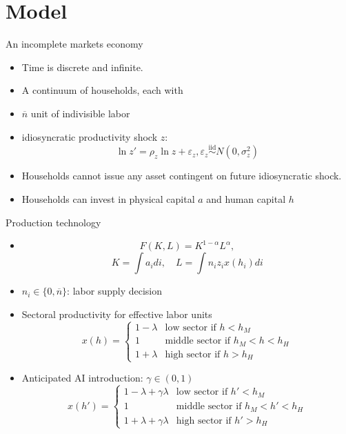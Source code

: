 \documentclass[serif, aspectratio=169]{beamer}
\theoremstyle{remark}
\theoremstyle{plain}
\begin{document}
\section{Model}
\begin{frame}{An incomplete markets economy}
\begin{itemize}
    \item Time is discrete and infinite.
    \item A continuum of households, each with 
    \item[-] $\overline{n}$ unit of indivisible labor
    \item[-] idiosyncratic productivity shock $z$:
    \begin{equation}
    \label{eq:z}
    \ln z'=\rho_z\ln z + \varepsilon_z, \varepsilon_z \overset{\mathrm{iid}}{\sim} N(0,\sigma_z^2)
    \end{equation}
    \item Households cannot issue any asset contingent on future idiosyncratic shock.
    \item Households can invest in physical capital $a$ and human capital $h$
\end{itemize}
    
\end{frame}

\begin{frame}{Production technology}
\begin{itemize}
\item[]
\begin{equation}
    F(K,L)=K^{1-\alpha} L^{\alpha},
\end{equation}
\begin{equation}
    K=\textstyle\int a_idi, \quad L=\textstyle\int n_iz_ix(h_i)di
\end{equation}
    \item $n_i \in \{0,\overline{n}\}$: labor supply decision
    \item Sectoral productivity for effective labor units
    \begin{equation}
    \label{eq:x}
x(h)=\left \{ 
\begin{array}{cl}
1-\lambda  & \text{low sector if }h<h_{M} \\ 
1 & \text{middle sector if }h_{M}<h<h_{H} \\ 
1+\lambda  & \text{high sector if }h>h_{H}%
\end{array}%
\right. 
\end{equation}
\item Anticipated AI introduction: $\gamma \in (0,1)$
\begin{equation}
    \label{eq:xAI}
x(h')=\left \{ 
\begin{array}{cl}
1-\lambda + \gamma \lambda & \text{low sector if }h'<h_{M} \\ 
1 & \text{middle sector if }h_{M}<h'<h_{H} \\ 
1+\lambda + \gamma \lambda & \text{high sector if }h'>h_{H}%
\end{array}%
\right. 
\end{equation}
\end{itemize}

\end{frame}
\end{document}
